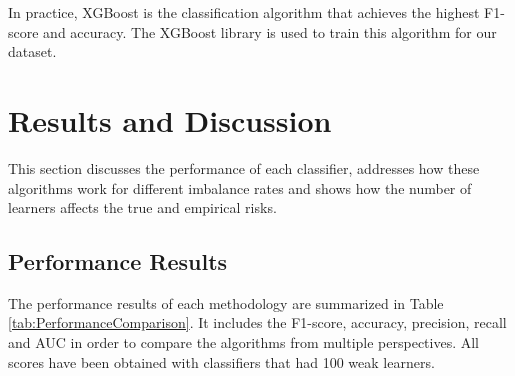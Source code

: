 \documentclass[conference]{IEEEtran}
\begin{document}
In practice, XGBoost is the classification algorithm that achieves the highest F1-score and accuracy. The XGBoost library is used to train this algorithm for our dataset.

\section{Results and Discussion}
This section discusses the performance of each classifier, addresses how these algorithms work for different imbalance rates and shows how the number of learners affects the true and empirical risks.

\subsection{Performance Results}

The performance results of each methodology are summarized in Table \ref{tab:PerformanceComparison}. It includes the F1-score, accuracy, precision, recall and AUC in order to compare the algorithms from multiple perspectives. All scores have been obtained with classifiers that had 100 weak learners.
\end{document}
